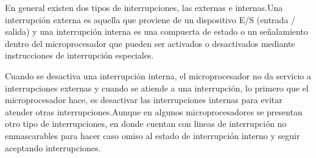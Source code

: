 \documentclass[12pt, letter]{article}
\begin{document}
\setlength{\parindent}{31pt}
En general existen dos tipos de interrupciones, las externas e internas.Una interrupción externa es aquella que proviene de un dispositivo E/S (entrada / salida) y una interrupción interna es una compuerta de estado o un señalamiento dentro del microprocesador que pueden ser activados o desactivados mediante instrucciones de interrupción especiales. 

\setlength{\parindent}{31pt}
Cuando se desactiva una interrupción interna, el microprocesador no da servicio a interrupciones externas y cuando se atiende a una interrupción, lo primero que el microprocesador hace, es desactivar las interrupciones internas para evitar atender otras interrupciones.Aunque en algunos microprocesadores se presentan otro tipo de interrupciones, en donde cuentan con lineas de interrupción no enmascarables para hacer caso omiso al estado de interrupción interno y seguir aceptando interrupciones.
\end{document}

